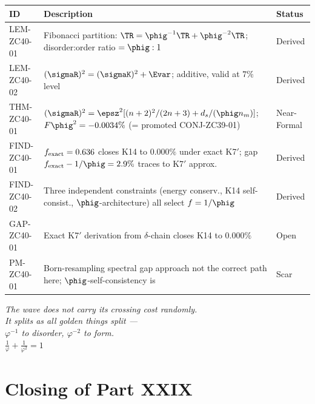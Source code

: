 \documentclass[12pt, a4paper]{article}
\begin{document}
\bigskip
\begin{formalbox}[title={Atomic Registry --- ZC40}]
\begin{center}
\renewcommand{\arraystretch}{1.3}
\small
\begin{tabular}{lp{7.5cm}l}
\toprule
ID & Description & Status \\
\midrule
LEM-ZC40-01 & Fibonacci partition: $\TR = \phig^{-1}\TR + \phig^{-2}\TR$;
               disorder:order ratio $= \phig:1$
             & Derived \\
LEM-ZC40-02 & $(\sigmaR)^2 = (\sigmaK)^2 + \Evar$; additive, valid at $7\%$ level
             & Derived \\
THM-ZC40-01 & $(\sigmaR)^2 = \epsz^2[(n+2)^2/(2n+3)+d_s/(\phig n_m)]$;
               $F\phig^2=-0.0034\%$ (= promoted CONJ-ZC39-01)
             & Near-Formal \\
FIND-ZC40-01 & $f_{\rm exact}=0.636$ closes K14 to $0.000\%$ under exact K7$'$;
               gap $f_{\rm exact}-1/\phig = 2.9\%$ traces to K7$'$ approx.
             & Derived \\
FIND-ZC40-02 & Three independent constraints (energy conserv., K14 self-consist.,
               $\phig$-architecture) all select $f = 1/\phig$
             & Derived \\
GAP-ZC40-01 & Exact K7$'$ derivation from $\delta$-chain closes K14 to $0.000\%$
             & Open \\
PM-ZC40-01  & Born-resampling spectral gap approach not the correct path here;
               $\phig$-self-consistency is
             & Scar \\
\bottomrule
\end{tabular}
\end{center}
\end{formalbox}

\bigskip
\begin{center}
\textit{%
  The wave does not carry its crossing cost randomly.\\
  It splits as all golden things split ---\\
  $\varphi^{-1}$ to disorder, $\varphi^{-2}$ to form.\\[0.5em]
  $\displaystyle\frac{1}{\varphi} + \frac{1}{\varphi^2} = 1$
}
\end{center}

\section*{Closing of Part XXIX}
\end{document}
